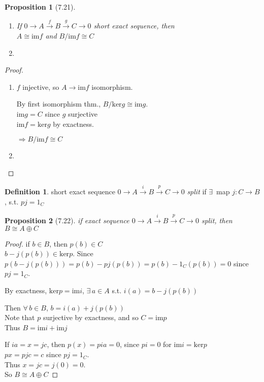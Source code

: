 \documentclass[twoside,landscape]{amsart}
\theoremstyle{plain}
\newtheorem{proposition}{Proposition}
\theoremstyle{definition}
\newtheorem{definition}{Definition}
\theoremstyle{remark}
\begin{document}
\begin{multicols*}{2}
\begin{proposition}[7.21]
  \begin{enumerate}
\item[(i)] If $0 \to A \xrightarrow{f} B \xrightarrow{g} C \to 0$ short exact sequence, then \\
$A \cong \text{im}f$ and $B/\text{im}f \cong C$
\item[(ii)]
\end{enumerate}
\end{proposition}

\begin{proof}
  \begin{enumerate}
    \item[(i)] $f$ injective, so $A \to \text{im}f$ isomorphism.  

By first isomorphism thm., $B/\text{ker}g \cong \text{im}g$.  \\
$\text{im}g = C$ since $g$ surjective \\
$\text{im}f = \text{ker}g$ by exactness.  

$\Longrightarrow B/\text{im}f \cong C$  
\item[(ii)]
\end{enumerate}
\end{proof}

\begin{definition}
  short exact sequence $0 \to A \xrightarrow{i} B \xrightarrow{p} C \to 0$ \emph{split} if $\exists \, $ map $j: C \to B$, s.t. $pj=1_C$
\end{definition}

\begin{proposition}[7.22]
  if exact sequence $0 \to A \xrightarrow{i} B \xrightarrow{p} C \to 0$ split, then $B \cong A \oplus C$  
\end{proposition}

\begin{proof}
  if $b \in B$, then $p(b) \in C$ \\
$b - j(p(b)) \in \text{ker}p$.  Since $p(b-j(p(b))) = p(b) - pj(p(b)) = p(b) -1_C(p(b)) = 0$ since $pj=1_C$.  

By exactness, $\text{ker}p = \text{im}i$, $\exists \, a \in A$ s.t. $i(a) = b-j(p(b))$

Then $\forall \, b \in B$, $b=i(a) + j(p(b))$ \\
\phantom{Then} Note that $p$ surjective by exactness, and so $C = \text{im}p$ \\
Thus $B = \text{im}i + \text{im}j$

If $ia=x=jc$, then $p(x) = pia=0$, since $pi =0$ for $\text{im}i = \text{ker}p$ \\
\phantom{if} $px=pjc =c$ since $pj=1_C$.  \\
Thus $x=jc = j(0) =0$.  \\
So $B \cong A\oplus C$
\end{proof}


\end{multicols*}
\end{document}
